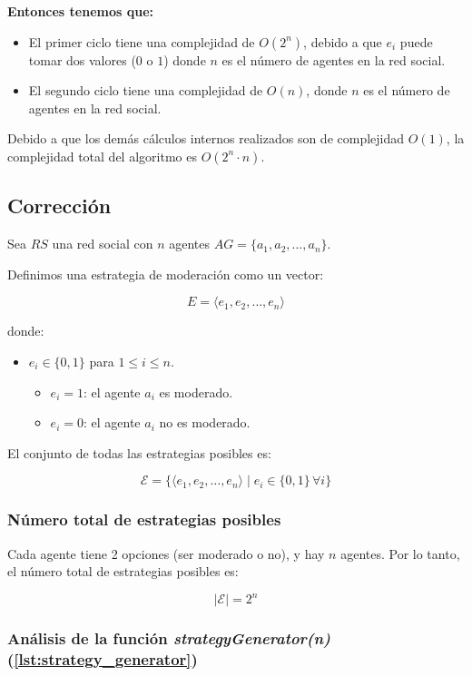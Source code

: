 \documentclass[letterpaper,10pt]{article}
\begin{document}
\textbf{Entonces tenemos que:}
\begin{itemize}
  \item El primer ciclo tiene una complejidad de \(O(2^n)\), debido a que $e_i$ puede tomar dos valores ($0$ o $1$) donde \(n\) es el número de agentes en la red social.
  \item El segundo ciclo tiene una complejidad de \(O(n)\), donde \(n\) es el número de agentes en la red social.
\end{itemize}
Debido a que los demás cálculos internos realizados son de complejidad \(O(1)\), la complejidad total del algoritmo es \(O(2^n \cdot n)\).
\subsection{Corrección}
\label{subsec:correccion_fuerza_bruta}
Sea $RS$ una red social con $n$ agentes $AG = \{a_1, a_2, \dots, a_n\}$.

Definimos una estrategia de moderación como un vector:

\[
E = \langle e_1, e_2, \dots, e_n \rangle
\]

donde:
\begin{itemize}
  \item $e_i \in \{0, 1\}$ para $1 \leq i \leq n$.
  \begin{itemize}
    \item $e_i = 1$: el agente $a_i$ es moderado.
    \item $e_i = 0$: el agente $a_i$ no es moderado.
  \end{itemize}
\end{itemize}

El conjunto de todas las estrategias posibles es:

\[
\mathcal{E} = \{\langle e_1, e_2, \dots, e_n \rangle \mid e_i \in \{0, 1\} \, \forall i\}
\]

\subsubsection*{Número total de estrategias posibles}

Cada agente tiene 2 opciones (ser moderado o no), y hay $n$ agentes. Por lo tanto, el número total de estrategias posibles es:

\[
|\mathcal{E}| = 2^n
\]

\subsubsection*{Análisis de la función \textit{strategyGenerator(n)} (\ref{lst:strategy_generator})}
\end{document}
